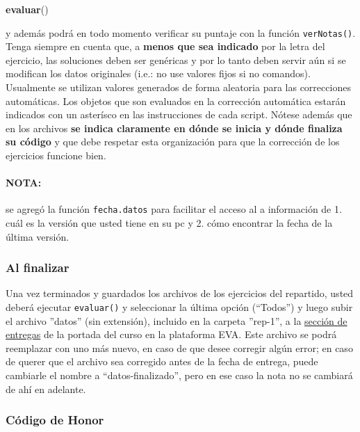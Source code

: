 \documentclass[]{article}
\newenvironment{Shaded}{}{}
\newcommand{\KeywordTok}[1]{\textcolor[rgb]{0.00,0.44,0.13}{\textbf{{#1}}}}
\newcommand{\NormalTok}[1]{{#1}}
\begin{document}
\begin{Shaded}
\begin{Highlighting}[]
\KeywordTok{evaluar}\NormalTok{()}
\end{Highlighting}
\end{Shaded}

y además podrá en todo momento verificar su puntaje con la función
\texttt{verNotas()}. Tenga siempre en cuenta que, a \textbf{menos que
sea indicado} por la letra del ejercicio, las soluciones deben ser
genéricas y por lo tanto deben servir aún si se modifican los datos
originales (i.e.: no use valores fijos si no comandos). Usualmente se
utilizan valores generados de forma aleatoria para las correcciones
automáticas. Los objetos que son evaluados en la corrección automática
estarán indicados con un asterísco en las instrucciones de cada script.
Nótese además que en los archivos \textbf{se indica claramente en dónde
se inicia y dónde finaliza su código} y que debe respetar esta
organización para que la corrección de los ejercicios funcione bien.

\paragraph{NOTA:}

se agregó la función \texttt{fecha.datos} para facilitar el acceso al a
información de 1. cuál es la versión que usted tiene en su pc y 2. cómo
encontrar la fecha de la última versión.

\subsubsection{Al finalizar}

Una vez terminados y guardados los archivos de los ejercicios del
repartido, usted deberá ejecutar \texttt{evaluar()} y seleccionar la
última opción (``Todos'') y luego subir el archivo ''datos'' (sin
extensión), incluido en la carpeta ''rep-1'', a la
\href{http://eva.universidad.edu.uy/mod/assign/view.php?id=103966}{sección
de entregas} de la portada del curso en la plataforma EVA. Este archivo
se podrá reemplazar con uno más nuevo, en caso de que desee corregir
algún error; en caso de querer que el archivo sea corregido antes de la
fecha de entrega, puede cambiarle el nombre a ``datos-finalizado'', pero
en ese caso la nota no se cambiará de ahí en adelante.

\subsubsection{Código de Honor}
\end{document}
